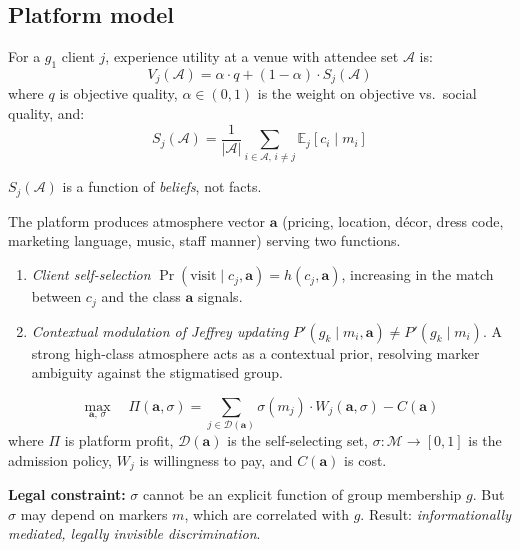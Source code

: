 \documentclass[12pt,a4paper]{article}
\theoremstyle{definition}
\numberwithin{proposition}{subsection}
\newcommand{\E}{\mathbb{E}}
\newcommand{\M}{\mathcal{M}}
\newcommand{\A}{\mathcal{A}}
\begin{document}
\subsection{Platform model}

For a $g_1$ client $j$, experience utility at a venue with attendee
set $\A$ is:
\begin{equation}
  V_j(\A) = \alpha \cdot q + (1 - \alpha) \cdot S_j(\A)
  \label{eq:experience}
\end{equation}
where $q$ is objective quality, $\alpha \in (0,1)$ is the weight on
objective vs.\ social quality, and:
\begin{equation}
  S_j(\A) = \frac{1}{|\A|} \sum_{i \in \A,\, i \neq j}
  \E_j[c_i \mid m_i]
  \label{eq:social-quality}
\end{equation}

$S_j(\A)$ is a function of \emph{beliefs}, not facts.


The platform produces atmosphere vector
$\mathbf{a}$ (pricing, location, d\'{e}cor, dress code,
marketing language, music, staff manner) serving two functions.
\begin{enumerate}


\item \emph{Client self-selection} $\Pr(\text{visit} \mid c_j, \mathbf{a}) = h(c_j, \mathbf{a})$, increasing in the match between $c_j$ and the class $\mathbf{a}$
signals.

\item \emph{Contextual modulation of Jeffrey updating} $P'(g_k \mid m_i, \mathbf{a}) \neq P'(g_k \mid m_i)$. A strong high-class atmosphere acts as a contextual prior, resolving marker
ambiguity against the stigmatised group.

\end{enumerate}

\begin{equation}
  \max_{\mathbf{a},\, \sigma} \quad
  \Pi(\mathbf{a}, \sigma) = \sum_{j \in \mathcal{D}(\mathbf{a})}
  \sigma(m_j) \cdot W_j(\mathbf{a}, \sigma) - C(\mathbf{a})
  \label{eq:platform-opt}
\end{equation}
where $\Pi$ is platform profit, $\mathcal{D}(\mathbf{a})$ is the
self-selecting set,
$\sigma: \M \to [0,1]$ is the admission policy, $W_j$ is willingness
to pay, and $C(\mathbf{a})$ is cost.

\textbf{Legal constraint:} $\sigma$ cannot be an explicit function of
group membership $g$. But $\sigma$ may depend on markers $m$, which
are correlated with $g$. Result: \emph{informationally mediated,
legally invisible discrimination}.
\end{document}
